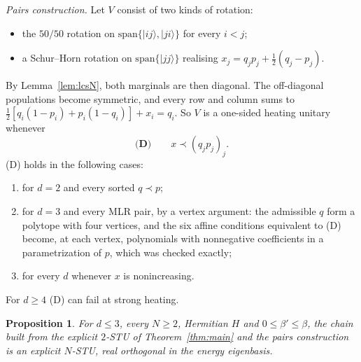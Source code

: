 \documentclass[11pt]{amsart}
\newtheorem{proposition}[lemma]{Proposition}
\theoremstyle{definition}
\theoremstyle{remark}
\numberwithin{equation}{section}
\begin{document}
\emph{Pairs construction.} Let $V$ consist of two kinds of rotation:
\begin{itemize}
\item the $50/50$ rotation on $\mathrm{span}\{|ij\rangle,|ji\rangle\}$ for every $i<j$;
\item a Schur--Horn rotation on $\mathrm{span}\{|jj\rangle\}$ realising $x_j=q_jp_j+\tfrac12(q_j-p_j)$.
\end{itemize}
By Lemma~\ref{lem:lcsN}, both marginals are then diagonal. The off-diagonal populations become symmetric, and every
row and column sums to $\tfrac12[q_i(1-p_i)+p_i(1-q_i)]+x_i=q_i$. So $V$ is a one-sided heating unitary whenever
\[
  \textbf{(D)}\qquad x\prec(q_jp_j)_j .
\]
(D) holds in the following cases:
\begin{enumerate}
\item for $d=2$ and every sorted $q\prec p$;
\item for $d=3$ and every MLR pair, by a vertex argument: the admissible $q$ form a polytope with four vertices, and
the six affine conditions equivalent to (D) become, at each vertex, polynomials with nonnegative coefficients in a
parametrization of $p$, which was checked exactly;
\item for every $d$ whenever $x$ is nonincreasing.
\end{enumerate}
For $d\ge4$ (D) can fail at strong heating.

\begin{proposition}\label{prop:smalld}
For $d\le3$, every $N\ge2$, Hermitian $H$ and $0\le\beta'\le\beta$, the chain built from the explicit $2$-STU of
Theorem~\ref{thm:main} and the pairs construction is an explicit $N$-STU, real orthogonal in the energy eigenbasis.
\end{proposition}
\end{document}
